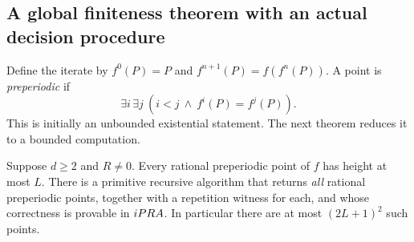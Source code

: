 \subsection{A global finiteness theorem with an actual decision procedure}

Define the iterate by $f^0(P)=P$ and $f^{n+1}(P)=f(f^n(P))$. A point is
\emph{preperiodic} if
\[
             \exists i\,\exists j\ (i<j\ \wedge\ f^i(P)=f^j(P)).
\]
This is initially an unbounded existential statement. The next theorem
reduces it to a bounded computation.

\begin{theorem}
\label{thm:preperiodic}
Suppose $d\ge2$ and $R\ne0$. Every rational preperiodic point of $f$ has
height at most $L$. There is a primitive recursive algorithm that returns
\emph{all} rational preperiodic points, together with a repetition witness
for each, and whose correctness is provable in $iPRA$.
In particular there are at most $(2L+1)^2$ such points.
\end{theorem}
